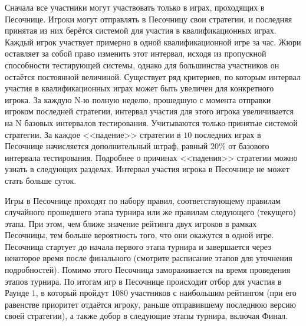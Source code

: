 Сначала все участники могут участвовать только в играх, проходящих в Песочнице. Игроки могут отправлять в Песочницу свои стратегии, и
последняя принятая из них берётся системой для участия в квалификационных играх. Каждый игрок участвует примерно в одной квалификационной
игре за час. Жюри оставляет за собой право изменить этот интервал, исходя из пропускной способности тестирующей системы, однако для
большинства участников он остаётся постоянной величиной. Существует ряд критериев, по которым интервал участия в квалификационных играх
может быть увеличен для конкретного игрока. За каждую N-ю полную неделю, прошедшую с момента отправки игроком последней стратегии, интервал
участия для этого игрока увеличивается на N базовых интервалов тестирования. Учитываются только принятые системой стратегии. За каждое
<<падение>> стратегии в $10$ последних играх в Песочнице начисляется дополнительный штраф, равный $20\%$ от базового интервала тестирования.
Подробнее о причинах <<падения>> стратегии можно узнать в следующих разделах. Интервал участия игрока в Песочнице не может стать больше
суток.

Игры в Песочнице проходят по набору правил, соответствующему правилам случайного прошедшего этапа турнира или же правилам следующего
(текущего) этапа. При этом, чем ближе значение рейтинга двух игроков в рамках Песочницы, тем больше вероятность того, что они окажутся в
одной игре. Песочница стартует до начала первого этапа турнира и завершается через некоторое время после финального (смотрите расписание
этапов для уточнения подробностей). Помимо этого Песочница замораживается на время проведения этапов турнира. По итогам игр в Песочнице
происходит отбор для участия в Раунде $1$, в который пройдут $1080$ участников с наибольшим рейтингом (при его равенстве приоритет отдаётся
игроку, раньше отправившему последнюю версию своей стратегии), а также добор в следующие этапы турнира, включая Финал.

